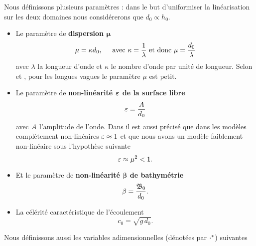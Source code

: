 \noindent Nous définissons plusieurs paramètres : dans le but d'uniformiser la linéarisation sur les deux domaines nous considérerons que $d_0 \propto h_0$.
\begin{itemize}[label=$\mybullet$]
\item Le paramètre de \textbf{dispersion $\boldsymbol{\mu}$}
	\begin{equation}
		\mu = \kappa d_0,\hspace{5mm}\text{avec }\kappa = \frac{1}{\lambda} \text{ et donc } \mu = \frac{d_0}{\lambda}
	\end{equation}
	avec $\lambda$ la longueur d'onde et $\kappa$ le nombre d'onde par unité de longueur. Selon \citet{bosi_spectral_2019} et \citet{Pons2018}, pour les longues vagues le paramètre $\mu$ est petit.\\
\item Le paramètre de \textbf{non-linéarité $\boldsymbol{\varepsilon}$ de la surface libre}
	\begin{equation}
		\varepsilon= \frac{A}{d_0}
	\end{equation}
	avec $A$ l'amplitude de l'onde. Dans \citet{bosi_spectral_2019} il est aussi précisé que dans les modèles complètement non-linéaires $\varepsilon \approx 1$ et que nous avons un modèle faiblement non-linéaire sous l'hypothèse suivante
	\begin{equation}
		\varepsilon \approx \mu^2 < 1.
	\end{equation}
\item Et le paramètre de \textbf{non-linéarité $\boldsymbol{\beta}$ de bathymétrie}
	\begin{equation}
		\beta = \frac{\mathfrak{B}_0}{d_0}.
	\end{equation}
\item La célérité caractéristique de l'écoulement
	\begin{equation}
		c_0 = \sqrt{g\,d_0}.
	\end{equation}
\end{itemize}
Nous définissons aussi les variables adimensionnelles (dénotées par ${{\cdot}^{*}}$) suivantes
